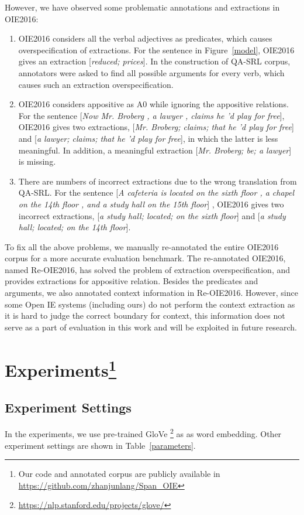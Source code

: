 \documentclass[letterpaper]{article} \usepackage{aaai20}  \usepackage{times}  \usepackage{helvet} \usepackage{courier}  \usepackage[hyphens]{url}  \urlstyle{rm} \def\UrlFont{\rm}  \usepackage{graphicx}  \frenchspacing  \setlength{\pdfpagewidth}{8.5in}  \setlength{\pdfpageheight}{11in}
\begin{document}
However, we have observed some problematic annotations and extractions in OIE2016:
\begin{enumerate}
\item OIE2016 considers all the verbal adjectives as predicates, which causes overspecification of extractions. For the sentence in Figure~\ref{model}, OIE2016 gives an extraction [\emph{reduced; prices}]. In the construction of QA-SRL corpus, annotators were asked to find all possible arguments for every verb, which causes such an extraction overspecification. 
\item OIE2016 considers appositive as A0 while ignoring the appositive relations. For the sentence [\emph{Now Mr. Broberg , a lawyer , claims he 'd play for free}], OIE2016 gives two extractions, [\emph{Mr. Broberg; claims; that he 'd play for free}] and [\emph{a lawyer; claims; that he 'd play for free}], in which the latter is less meaningful. In addition, a meaningful extraction [\emph{Mr. Broberg; be; a lawyer}] is missing. 
\item There are numbers of incorrect extractions due to the wrong translation from QA-SRL. For the sentence  [\emph{A cafeteria is located on the sixth floor , a chapel on the 14th floor , and a study hall on the 15th floor}] , OIE2016 gives two incorrect extractions, [\emph{a study hall; located; on the sixth floor}] and [\emph{a study hall; located; on the 14th floor}]. 
\end{enumerate}

To fix all the above problems, we manually re-annotated the entire OIE2016 corpus for a more accurate evaluation benchmark. The re-annotated OIE2016, named Re-OIE2016, has solved the problem of extraction overspecification, and provides extractions for appositive relation. Besides the predicates and arguments, we also annotated context information in Re-OIE2016. However, since some Open IE systems (including ours) do not perform the context extraction as it is hard to judge the correct boundary for context, this information does not serve as a part of evaluation in this work and will be exploited in future research.

\section{Experiments\footnote{Our code and annotated corpus are publicly available in \url{https://github.com/zhanjunlang/Span_OIE}}}
\subsection{Experiment Settings}
In the experiments, we use pre-trained GloVe \footnote{\url{https://nlp.stanford.edu/projects/glove/}} as as word embedding. Other experiment settings are shown in Table~\ref{parameters}.
\end{document}
